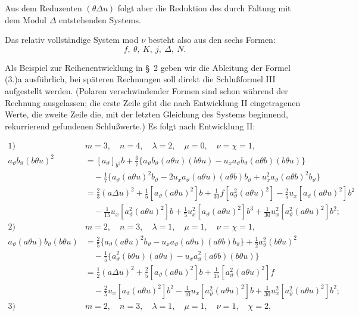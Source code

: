 \documentclass[11pt]{article}
\newcommand{\A}{\Delta}
\begin{document}
Aus dem Reduzenten $(\theta\A u)$ folgt aber die Reduktion des durch Faltung mit dem Modul $\A$ entstehenden Systems.

\bigskip


Das relativ vollständige System mod $\nu$ besteht also aus den sechs Formen:
\[
f,\ \theta,\ K,\ j,\ \A,\ N.
\]

Als Beispiel zur Reihenentwicklung in \S\ 2 geben wir die Ableitung der Formel (3.)a ausführlich, bei späteren Rechnungen soll direkt die Schlußformel III aufgestellt werden. (Polaren verschwindender Formen sind schon während der Rechnung ausgelassen; die erste Zeile gibt die nach Entwicklung II eingetragenen Werte, die zweite Zeile die, mit der letzten Gleichung des Systems beginnend, rekurrierend gefundenen Schlußwerte.) Es folgt nach Entwicklung II:


\begin{align*}
\text{1)}\quad&m=3,\quad n=4,\quad \lambda=2,\quad \mu=0,\quad \nu=\chi=1,\\
a_\vartheta b_\vartheta(b\theta u)^2
&=[a_\vartheta]_{b^2}b+\frac67\{a_\vartheta b_\vartheta(a\theta u)(b\theta u)-u_xa_\vartheta b_\vartheta(a\theta b)(b\theta u)\}\\
&\quad-\frac17\{a_\vartheta(a\theta u)^2b_\vartheta-2u_xa_\vartheta(a\theta u)(a\theta b)b_\vartheta+u_x^2a_\vartheta(a\theta b)^2b_\vartheta\}\\
&=\frac23(a\Delta u)^2+\frac15[a_\vartheta(a\theta u)^2]b+\frac1{30}f[a_\vartheta^2(a\theta u)^2]-\frac25u_x[a_\vartheta(a\theta u)^2]b^2\\
&\quad-\frac1{15}u_x[a_\vartheta^2(a\theta u)^2]b+\frac15u_x^2[a_\vartheta(a\theta u)^2]b^3+\frac1{30}u_x^2[a_\vartheta^2(a\theta u)^2]b^2;\\[.6em]
\text{2)}\quad&m=2,\quad n=3,\quad \lambda=1,\quad \mu=1,\quad \nu=\chi=1,\\
a_\vartheta(a\theta u)b_\vartheta(b\theta u)
&=\frac25\{a_\vartheta(a\theta u)^2b_\vartheta-u_xa_\vartheta(a\theta u)(a\theta b)b_\vartheta\}+\frac12a_\vartheta^2(b\theta u)^2\\
&\quad-\frac15\{a_\vartheta^2(b\theta u)(a\theta u)-u_xa_\vartheta^2(a\theta b)(b\theta u)\}\\
&=\frac12(a\Delta u)^2+\frac25[a_\vartheta(a\theta u)^2]b+\frac1{15}[a_\vartheta^2(a\theta u)^2]f\\
&\quad-\frac25u_x[a_\vartheta(a\theta u)^2]b^2-\frac1{10}u_x[a_\vartheta^2(a\theta u)^2]b+\frac1{30}u_x^2[a_\vartheta^2(a\theta u)^2]b^2;\\[.6em]
\text{3)}\quad&m=2,\quad n=3,\quad \lambda=1,\quad \mu=1,\quad \nu=1,\quad \chi=2,\\

\end{align*}
\end{document}
